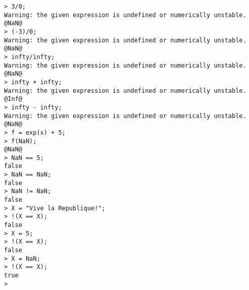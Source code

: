 \begin{center}\begin{minipage}{15cm}\begin{Verbatim}[frame=single]
> 3/0;
Warning: the given expression is undefined or numerically unstable.
@NaN@
> (-3)/0;
Warning: the given expression is undefined or numerically unstable.
@NaN@
> infty/infty;
Warning: the given expression is undefined or numerically unstable.
@NaN@
> infty + infty;
Warning: the given expression is undefined or numerically unstable.
@Inf@
> infty - infty;
Warning: the given expression is undefined or numerically unstable.
@NaN@
> f = exp(x) + 5;
> f(NaN);
@NaN@
> NaN == 5;
false
> NaN == NaN;
false
> NaN != NaN;
false
> X = "Vive la Republique!";
> !(X == X);
false
> X = 5;
> !(X == X);
false
> X = NaN;
> !(X == X);
true
> 
\end{Verbatim}
\end{minipage}\end{center}

